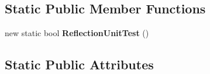 \subsection*{Static Public Member Functions}
\begin{DoxyCompactItemize}
\item 
\hypertarget{class_s_e_mod_a_p_i_internal_1_1_a_p_i_1_1_entity_1_1_sector_1_1_sector_object_1_1_cube_grid_1_1_cube_block_1_1_light_entity_a4d22e431a0be0609c9f729c78d878417}{}new static bool {\bfseries Reflection\+Unit\+Test} ()\label{class_s_e_mod_a_p_i_internal_1_1_a_p_i_1_1_entity_1_1_sector_1_1_sector_object_1_1_cube_grid_1_1_cube_block_1_1_light_entity_a4d22e431a0be0609c9f729c78d878417}

\end{DoxyCompactItemize}
\subsection*{Static Public Attributes}

